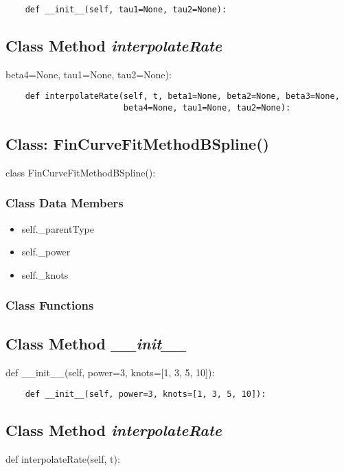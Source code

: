 \documentclass[twoside,11pt]{book}
\begin{document}
\begin{lstlisting}
    def __init__(self, tau1=None, tau2=None):
\end{lstlisting}

\subsection{Class Method {\it interpolateRate}}
beta4=None, tau1=None, tau2=None):

\begin{lstlisting}
    def interpolateRate(self, t, beta1=None, beta2=None, beta3=None,
                        beta4=None, tau1=None, tau2=None):
\end{lstlisting}

\subsection{Class: FinCurveFitMethodBSpline()}
class FinCurveFitMethodBSpline():

\subsubsection{Class Data Members}
\begin{itemize}
\item{self.\_parentType}
\item{self.\_power}
\item{self.\_knots}
\end{itemize}

\subsubsection{Class Functions}

\subsection{Class Method {\it \_\_init\_\_}}
def \_\_init\_\_(self, power=3, knots=[1, 3, 5, 10]):

\begin{lstlisting}
    def __init__(self, power=3, knots=[1, 3, 5, 10]):
\end{lstlisting}

\subsection{Class Method {\it interpolateRate}}
def interpolateRate(self, t):
\end{document}
